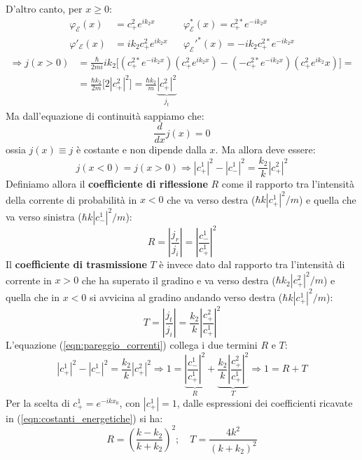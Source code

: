 \documentclass[../../FisicaTeorica.tex]{subfiles}
\begin{document}
D'altro canto, per $x\geq 0$:
\begin{align*}
\varphi_\mathcal{E}(x)&=c^2_+ e^{ik_2x} && \varphi_\mathcal{E}^*(x)=c^{2*}_+e^{-ik_2x}\\
\varphi'_\mathcal{E}(x)&=ik_2 c^2_+ e^{ik_2 x} && \varphi_\mathcal{E}'^*(x)=-ik_2 c^{2*}_+ e^{-ik_2 x}
\end{align*}
\begin{align*}
\Rightarrow j(x>0)&=\frac{\hbar}{2mi}ik_2\big[(c^{2*}_+ e^{-ik_2 x})(c^2_+ e^{ik_2 x})-(-c^{2*}_+e^{-ik_2 x})(c^2_+ e^{ik_2}x)\big] =\\
&=\frac{\hbar k_2}{2m}\big[2 |c^2_+|^2\big] = \frac{\hbar k_2}{m}\underbrace{|c^2_+|^2}_{j_t}
\end{align*}
Ma dall'equazione di continuità sappiamo che:
\[
\frac{d}{dx}j(x)=0
\]
ossia $j(x) \equiv j$ è costante e non dipende dalla $x$. Ma allora deve essere:
\begin{equation}
j(x<0)=j(x>0) \Rightarrow  |c^1_+|^2-|c^1_-|^2=\frac{k_2}{k}|c^2_+|^2
\label{eqn:pareggio_correnti}
\end{equation}
Definiamo allora il \textbf{coefficiente di riflessione} $R$ come il rapporto tra l'intensità della corrente di probabilità in $x<0$ che va verso destra ($\hbar k |c^1_+|^2/m$) e quella che va verso sinistra ($\hbar k |c^1_-|^2/m$):
\[
R=\left| \frac{j_r}{j_i} \right |=\left | \frac{c^1_-}{c^1_+}\right |^2
\]
Il \textbf{coefficiente di trasmissione} $T$ è invece dato dal rapporto tra l'intensità di corrente in $x>0$ che ha superato il gradino e va verso destra ($\hbar k_2 |c^2_+|^2/m$) e quella che in $x<0$ si avvicina al gradino andando verso destra ($\hbar k |c^1_+|^2/m$):
\[
T=\left | \frac{j_t}{j_i} \right |
=\frac{k_2}{k}\left | \frac{c^2_+}{c^1_+}\right |^2
\]
L'equazione (\ref{eqn:pareggio_correnti}) collega i due termini $R$ e $T$:
\[
|c^1_+|^2 - |c^1_-|^2 = \frac{k_2}{k}
|c^2_+|^2 \Rightarrow 1=
\underbrace{\left |\frac{c^1_-}{c^1_+}\right |^2}_{R} +
\underbrace{\frac{k_2}{k}\left | \frac{c^2_+}{c^1_+}\right |^2}_{T} \Rightarrow 1=R+T
\]
Per la scelta di $c^1_+=e^{-ikx_0}$, con $|c^1_+|=1$, dalle espressioni dei coefficienti ricavate in (\ref{eqn:costanti_energetiche}) si ha:
\[
R=\left(\frac{k-k_2}{k+k_2}\right)^2;\quad T=
\frac{4k^2}{(k+k_2)^2}
\]
\end{document}
